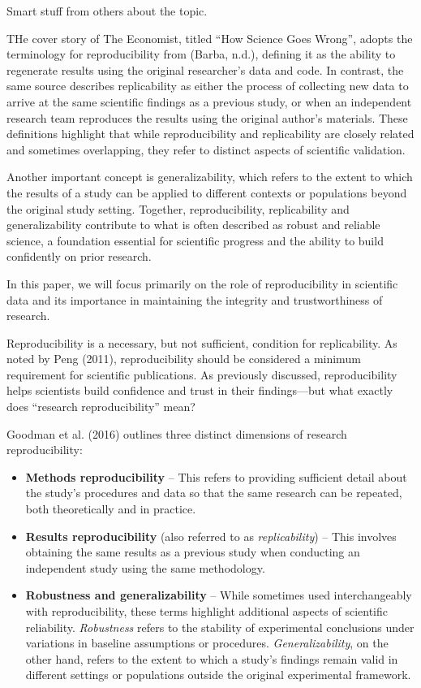 \documentclass[
  british,
  a4paper,
]{article}
\providecommand{\tightlist}{%
  \setlength{\itemsep}{0pt}\setlength{\parskip}{0pt}}
\begin{document}
Smart stuff from others about the topic.

THe cover story of The Economist, titled ``How Science Goes Wrong'',
adopts the terminology for reproducibility from (Barba, n.d.), defining
it as the ability to regenerate results using the original researcher's
data and code. In contrast, the same source describes replicability as
either the process of collecting new data to arrive at the same
scientific findings as a previous study, or when an independent research
team reproduces the results using the original author's materials. These
definitions highlight that while reproducibility and replicability are
closely related and sometimes overlapping, they refer to distinct
aspects of scientific validation.

Another important concept is generalizability, which refers to the
extent to which the results of a study can be applied to different
contexts or populations beyond the original study setting. Together,
reproducibility, replicability and generalizability contribute to what
is often described as robust and reliable science, a foundation
essential for scientific progress and the ability to build confidently
on prior research.

In this paper, we will focus primarily on the role of reproducibility in
scientific data and its importance in maintaining the integrity and
trustworthiness of research.

Reproducibility is a necessary, but not sufficient, condition for
replicability. As noted by Peng (2011), reproducibility should be
considered a minimum requirement for scientific publications. As
previously discussed, reproducibility helps scientists build confidence
and trust in their findings---but what exactly does ``research
reproducibility'' mean?

Goodman et al. (2016) outlines three distinct dimensions of research
reproducibility:

\begin{itemize}
\tightlist
\item
  \textbf{Methods reproducibility} -- This refers to providing
  sufficient detail about the study's procedures and data so that the
  same research can be repeated, both theoretically and in practice.
\item
  \textbf{Results reproducibility} (also referred to as
  \emph{replicability}) -- This involves obtaining the same results as a
  previous study when conducting an independent study using the same
  methodology.
\item
  \textbf{Robustness and generalizability} -- While sometimes used
  interchangeably with reproducibility, these terms highlight additional
  aspects of scientific reliability. \emph{Robustness} refers to the
  stability of experimental conclusions under variations in baseline
  assumptions or procedures. \emph{Generalizability}, on the other hand,
  refers to the extent to which a study's findings remain valid in
  different settings or populations outside the original experimental
  framework.
\end{itemize}
\end{document}
